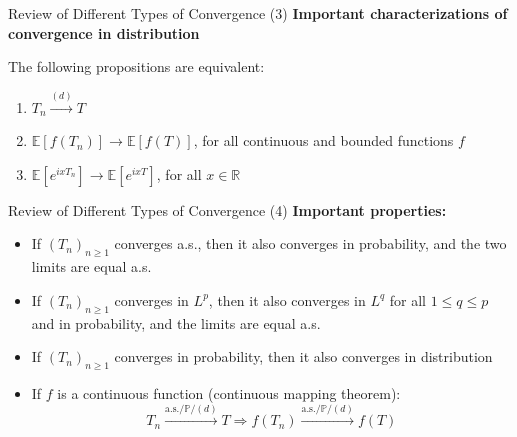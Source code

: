 \documentclass[aspectratio=169]{beamer}
\begin{document}
\begin{frame}{Review of Different Types of Convergence (3)}
\textbf{Important characterizations of convergence in distribution}

\vspace{0.3cm}

The following propositions are equivalent:
\begin{enumerate}
    \item[(i)] $T_n \xrightarrow{(d)} T$
    \item[(ii)] $\mathbb{E}[f(T_n)] \to \mathbb{E}[f(T)]$, for all continuous and bounded functions $f$
    \item[(iii)] $\mathbb{E}[e^{ixT_n}] \to \mathbb{E}[e^{ixT}]$, for all $x \in \mathbb{R}$
\end{enumerate}
\end{frame}

\begin{frame}{Review of Different Types of Convergence (4)}
\textbf{Important properties:}
\begin{itemize}
    \item If $(T_n)_{n\geq 1}$ converges a.s., then it also converges in probability, and the two limits are equal a.s.

    \item If $(T_n)_{n\geq 1}$ converges in $L^p$, then it also converges in $L^q$ for all $1 \leq q \leq p$ and in probability, and the limits are equal a.s.

    \item If $(T_n)_{n\geq 1}$ converges in probability, then it also converges in distribution

    \item If $f$ is a continuous function (continuous mapping theorem):
    \[T_n \xrightarrow{\text{a.s.}/\mathbb{P}/(d)} T \Rightarrow f(T_n) \xrightarrow{\text{a.s.}/\mathbb{P}/(d)} f(T)\]
\end{itemize}
\end{frame}
\end{document}

